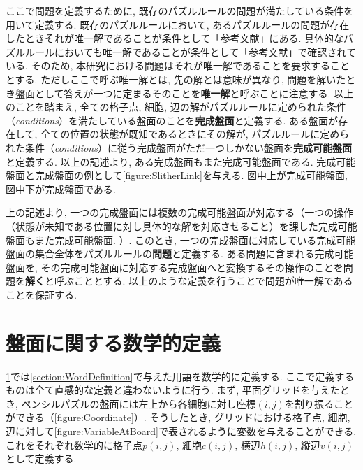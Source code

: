 ここで問題を定義するために, 既存のパズルルールの問題が満たしている条件を用いて定義する. 既存のパズルルールにおいて, あるパズルルールの問題が存在したときそれが唯一解であることが条件として「参考文献」にある. 具体的なパズルルールにおいても唯一解であることが条件として「参考文献」で確認されている. そのため, 本研究における問題はそれが唯一解であることを要求することとする. ただしここで呼ぶ唯一解とは, 先の解とは意味が異なり, 問題を解いたとき盤面として答えが一つに定まるそのことを\textbf{唯一解}と呼ぶことに注意する.
以上のことを踏まえ, 全ての格子点, 細胞, 辺の解がパズルルールに定められた条件（\textit{conditions}）を満たしている盤面のことを\textbf{完成盤面}と定義する. ある盤面が存在して, 全ての位置の状態が既知であるときにその解が, パズルルールに定められた条件（\textit{conditions}）に従う完成盤面がただ一つしかない盤面を\textbf{完成可能盤面}と定義する. 以上の記述より, ある完成盤面もまた完成可能盤面である. 完成可能盤面と完成盤面の例として\cref{figure:SlitherLink}を与える. 図中上が完成可能盤面, 図中下が完成盤面である.

上の記述より, 一つの完成盤面には複数の完成可能盤面が対応する（一つの操作（状態が未知である位置に対し具体的な解を対応させること）を課した完成可能盤面もまた完成可能盤面. ）. このとき, 一つの完成盤面に対応している完成可能盤面の集合全体をパズルルールの\textbf{問題}と定義する. ある問題に含まれる完成可能盤面を, その完成可能盤面に対応する完成盤面へと変換するその操作のことを問題を\textbf{解く}と呼ぶこととする.
以上のような定義を行うことで問題が唯一解であることを保証する.

\section{盤面に関する数学的定義}\label{section:MathematicalDefinition}
\cref{section:MathematicalDefinition}では\cref{section:WordDefinition}で与えた用語を数学的に定義する. ここで定義するものは全て直感的な定義と違わないように行う.
まず, 平面グリッドを与えたとき, ペンシルパズルの盤面には左上から各細胞に対し座標$(i,j)$を割り振ることができる（\cref{figure:Coordinate}）. そうしたとき, グリッドにおける格子点, 細胞, 辺に対して\cref{figure:VariableAtBoard}で表されるように変数を与えることができる.
これをそれぞれ数学的に格子点$p(i,j)$, 細胞$c(i,j)$, 横辺$h(i,j)$, 縦辺$v(i,j)$として定義する.

